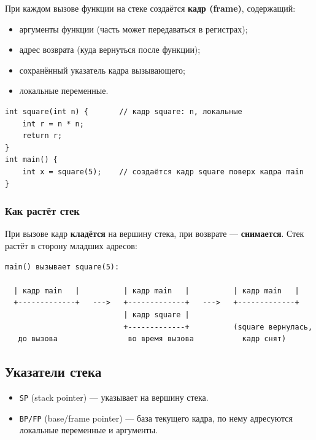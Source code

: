 При каждом вызове функции на стеке создаётся \textbf{кадр (frame)}, содержащий:

\begin{itemize}[leftmargin=2em]
    \item аргументы функции (часть может передаваться в регистрах);
    \item адрес возврата (куда вернуться после функции);
    \item сохранённый указатель кадра вызывающего;
    \item локальные переменные.
\end{itemize}

\begin{lstlisting}
int square(int n) {       // кадр square: n, локальные
    int r = n * n;
    return r;
}
int main() {
    int x = square(5);    // создаётся кадр square поверх кадра main
}
\end{lstlisting}

\subsubsection{Как растёт стек}

При вызове кадр \textbf{кладётся} на вершину стека, при возврате ---
\textbf{снимается}. Стек растёт в сторону младших адресов:

\begin{lstlisting}[numbers=none]
main() вызывает square(5):

  | кадр main   |          | кадр main   |          | кадр main   |
  +-------------+   --->   +-------------+   --->   +-------------+
                           | кадр square |
                           +-------------+          (square вернулась,
   до вызова                во время вызова           кадр снят)
\end{lstlisting}

\subsection{Указатели стека}

\begin{itemize}[leftmargin=2em]
    \item \texttt{SP} (stack pointer) --- указывает на вершину стека.
    \item \texttt{BP/FP} (base/frame pointer) --- база текущего кадра, по нему
          адресуются локальные переменные и аргументы.
\end{itemize}

